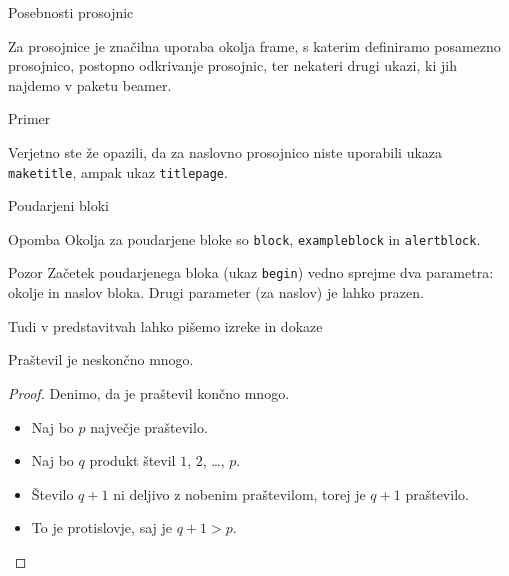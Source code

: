 \begin{frame}{Posebnosti prosojnic}

	\begin{exampleblock}{}
		Za prosojnice je značilna uporaba okolja frame, s katerim
		definiramo posamezno prosojnico,
		\pause
	postopno odkrivanje prosojnic,
		\pause
	ter nekateri drugi ukazi, ki jih najdemo v paketu beamer.
	\pause
	\end{exampleblock}
	\begin{exampleblock}{Primer}
		
		Verjetno ste že opazili, da za naslovno prosojnico niste uporabili
		ukaza \texttt{maketitle}, ampak ukaz \texttt{titlepage}.
	\end{exampleblock}
\end{frame}

\begin{frame}{Poudarjeni bloki}

		\begin{block}{Opomba}
			Okolja za poudarjene bloke so \texttt{block}, \texttt{exampleblock} in \texttt{alertblock}.
		\end{block}

		\begin{alertblock}{Pozor}
			Začetek poudarjenega bloka (ukaz \texttt{begin}) vedno sprejme 
			dva parametra: okolje in naslov bloka.
			Drugi parameter (za naslov) je lahko prazen. 
		\end{alertblock}

\end{frame}

\begin{frame}{Tudi v predstavitvah lahko pišemo izreke in dokaze}

	\begin{izrek}
	   Praštevil je neskončno mnogo.
	\end{izrek}
	\begin{proof}
	   Denimo, da je praštevil končno mnogo.
	   \begin{itemize}[<+->]
		  \item Naj bo $p$ \alert<4>{največje} praštevilo.
		  \item Naj bo $q$ produkt števil $1$, $2$, \ldots, $p$.
		  \item Število $q+1$ ni deljivo z nobenim praštevilom, torej je $q+1$ praštevilo.
		  \item To je protislovje, saj je $q+1>p$. \qedhere
	   \end{itemize}
	\end{proof}
 \end{frame}
 